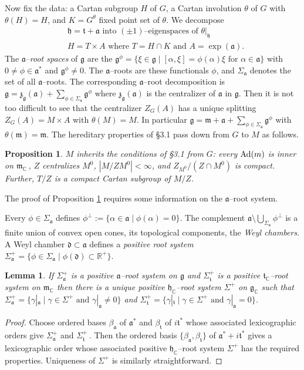 \documentclass{conm-p-l}
\newtheorem{lemma}[equation]{Lemma}
\newtheorem{proposition}[equation]{Proposition}
\renewcommand{\gg}{\mathfrak{g}}
\def\ga{\mathfrak{a}}
\def\gd{\mathfrak{d}}
\def\gg{\mathfrak{g}}
\def\gh{\mathfrak{h}}
\def\gm{\mathfrak{m}}
\def\gt{\mathfrak{t}}
\def\gz{\mathfrak{z}}
\def\Ad{{\rm Ad}}
\def\C{\mathbb{C}}
\def\R{\mathbb{R}}
\begin{document}
Now fix the data:
a Cartan subgroup $H$ of $G$, 
a Cartan involution $\theta$ of $G$ with $\theta(H) = H$,
and $K = G^\theta$ fixed point set of $\theta$.
We decompose
\begin{equation}\label{4.1.4}
\begin{aligned}
&\gh = \gt + \ga \text{ into } (\pm 1)\text{--eigenspaces of } \theta|_\gh \\
&H = T \times A \text{ where } T = H \cap K \text{ and } A = \exp(\ga).
\end{aligned}
\end{equation}
The $\ga$--{\em root spaces} of $\gg$ are the $\gg^\phi = 
\{\xi \in \gg \mid [\alpha,\xi] = \phi(\alpha)\xi \text{ for } \alpha \in \ga\}$
with $0 \ne \phi \in \ga^*$ and $\gg^\phi \ne 0$.  The $\ga$--roots are
these functionals $\phi$, and $\Sigma_\ga$ denotes the set of all $\ga$--roots.
The corresponding $\ga$--root decomposition is
$\gg = \gz_\gg(\ga) + \sum_{\phi \in \Sigma_\ga} \gg^\phi$ where
$\gz_\gg(\ga)$ is the centralizer of $\ga$ in $\gg$.
Then it is not too difficult to see that
the centralizer $Z_G(A)$ has a unique splitting $Z_G(A)=M\times A$ with
$\theta(M) = M$.  In particular 
$\gg=\gm + \ga + \sum_{\phi \in \Sigma_\ga} \gg^\phi$ with $\theta(\gm) = \gm$.
The hereditary properties of \S 3.1 pass down from $G$ to $M$ as follows.

\begin{proposition}\label{4.1.6}
$M$ inherits the conditions of {\rm \S 3.1} from $G$: every $\Ad(m)$ is inner on
$\gm_\C$\,, $Z$ centralizes $M^0$, $|M/ZM^0| < \infty$, and 
$Z_{M^0}/(Z\cap M^0)$ is compact.  Further, $T/Z$ is a compact Cartan subgroup
of $M/Z$.
\end{proposition}
The proof of Proposition \ref{4.1.6} requires some information on the
$\ga$--root system.

Every $\phi \in \Sigma_\ga$ defines $\phi^\perp := \{\alpha \in \ga \mid 
\phi(\alpha) = 0\}$. The complement 
$\ga \setminus \bigcup_{\Sigma_\ga}\phi^\perp$ is a finite union of convex 
open cones, its topological components, the {\em Weyl chambers}.  A 
Weyl chamber $\gd \subset \ga$ defines a {\em positive root system}
$\Sigma_\ga^+ = \{\phi \in \Sigma_\ga \mid \phi(\gd) \subset \R^+\}$.
\begin{lemma}\label{4.1.7}
If $\Sigma_\ga^+$ is a positive $\ga$--root system on $\gg$ and $\Sigma_\gt^+$
is a positive $\gt_\C$--root system on $\gm_\C$ then there is a unique
positive $\gh_\C$--root system $\Sigma^+$ on $\gg_\C$ such that
$\Sigma_\ga^+ = \{\gamma|_\ga \mid \gamma \in \Sigma^+ \text{ and }
\gamma|_\ga \ne 0\}$ and $\Sigma_\gt^+ = 
\{\gamma|_\gt \mid \gamma \in \Sigma^+ \text{ and } \gamma|_\ga  = 0\}$.
\end{lemma}
\begin{proof}  Choose ordered bases $\beta_\ga$ of $\ga^*$ and $\beta_{\gt}$
of $i\gt^*$ whose associated lexicographic orders give $\Sigma_\ga^+$ and
$\Sigma_\gt^+$\,.  Then the ordered basis $\{\beta_\ga,\beta_{\gt}\}$ of
$\ga^* +i\gt^*$ gives a lexicographic order whose associated positive
$\gh_\C$--root system $\Sigma^+$ has the required properties.  Uniqueness
of $\Sigma^+$ is similarly straightforward.
\end{proof}
\end{document}

